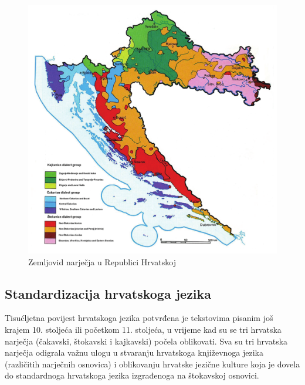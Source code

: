 \begin{multicols}{2}
\begin{figure}[htb]
  \center
  \includegraphics[width=\textwidth]{../_media/croatian/map-dialects}
  \caption{Zemljovid narječja u Republici Hrvatskoj}
  \label{fig:zemljovid}
\end{figure}

\subsection{Standardizacija hrvatskoga jezika}

Tisućljetna povijest hrvatskoga jezika potvrđena je tekstovima pisanim još krajem 10. stoljeća ili početkom 11. stoljeća, u vrijeme kad su se tri hrvatska narječja (čakavski, štokavski i kajkavski) počela oblikovati. Sva su tri hrvatska narječja odigrala važnu ulogu u stvaranju hrvatskoga književnoga jezika (različitih narječnih osnovica) i oblikovanju hrvatske jezične kulture koja je dovela do standardnoga hrvatskoga jezika izgrađenoga na štokavskoj osnovici.



\end{multicols}
